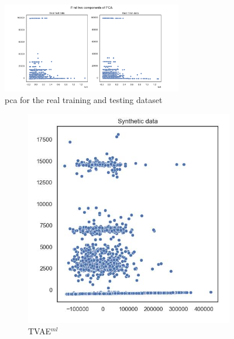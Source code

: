 \begin{figure}[H]
	\centering
	\includegraphics[width=0.7\textwidth]{images/pca/pca.png}
	\caption[PCA plot Real Data]{\gls{pca} for the real training and testing dataset}
	\label{fig:pca}
\end{figure}


\begin{figure}[H]
	\centering
	\begin{subfigure}{0.3\textwidth}
		\centering
		\includegraphics[width=\textwidth]{images/pca/tvae.jpg}
		\caption{TVAE$^{ml}$}
	\end{subfigure}
	\begin{subfigure}{0.3\textwidth}
		\centering

\end{subfigure}
\end{figure}
